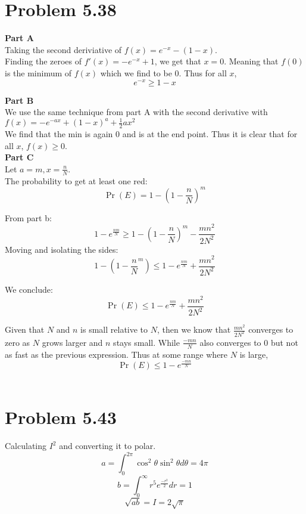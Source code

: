 \documentclass[10pt]{amsart}
\begin{document}
\section*{\large \textbf{Problem 5.38}}

\noindent \textbf{\small Part A} \\
Taking the second deriviative of
$f(x) = e^{-x} - (1-x)$. \\
Finding the zeroes of $f'(x) = -e^{-x} + 1$, we get that $x=0$. Meaning that
$f(0)$ is the minimum of $f(x)$ which we find to be $0$. Thus for all $x$,
\[e^{-x} \geq 1 - x\]

\noindent \textbf{\small Part B} \\
We use the same technique from part A with the second derivative with
$f(x) = -e^{-ax} + (1-x)^a + \frac{1}{2}ax^2$ \\
We find that the min is again $0$ and is at the end point. Thus it is clear that
for all $x$, $f(x) \geq 0$. \\

\noindent \textbf{\small Part C} \\
Let $a=m, x = \frac{n}{N}$. \\
The probability to get at least one red:
\[\Pr(E) = 1 - (1 - \frac{n}{N})^m\]

From part b:
\[1 - e^{\frac{nm}{N}} \geq 1 - (1 - \frac{n}{N})^m - \frac{mn^2}{2N^2}\]
Moving and isolating the sides:
\[ 1 - (1 - \frac{n}{N}^m) \leq 1 - e^{\frac{nm}{N}} + \frac{mn^2}{2N^2}\]

We conclude:
\[\Pr(E) \leq 1 - e^{\frac{nm}{N}} + \frac{mn^2}{2N^2}\]

Given that $N$ and $n$ is small relative to $N$, then we know that
$\frac{mn^2}{2N^2}$ converges to zero as $N$ grows larger and $n$ stays small.
While $\frac{-mn}{N}$ also converges to 0 but not as fast as the previous expression.
Thus at some range where $N$ is large,
\[\Pr(E) \leq 1 - e^{\frac{-mn}{N}}\]
\\

\section*{\large \textbf{Problem 5.43}}
Calculating $I^2$ and converting it to polar.
\[ a = \int_{0}^{2\pi}\cos^2\theta\sin^2\theta d\theta = 4\pi\]
\[ b = \int_{0}^{\infty}r^5e^{\frac{-r^2}{2}}dr = 1\]
\[\sqrt{ab} = I = 2\sqrt{\pi}\]
\end{document}
